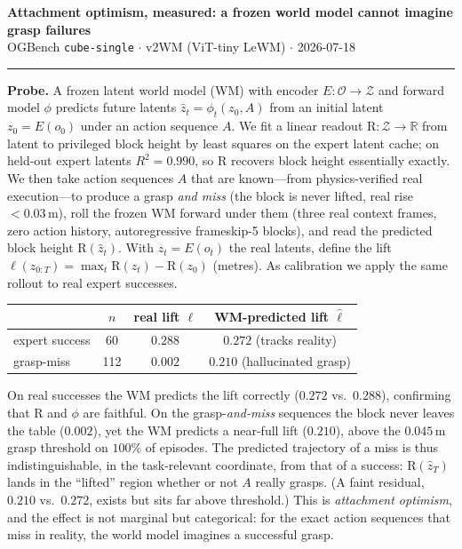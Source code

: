 \documentclass[11pt]{article}
\newcommand{\R}{\mathrm{R}}
\newcommand{\Z}{\mathcal{Z}}
\begin{document}
{\large\bfseries Attachment optimism, measured: a frozen world model cannot imagine grasp failures}\\[0.2em]
{\small OGBench \texttt{cube-single} $\cdot$ v2WM (ViT-tiny LeWM) $\cdot$ 2026-07-18}

\vspace{0.4em}
\hrule
\vspace{0.6em}

\textbf{Probe.} A frozen latent world model (WM) with encoder
$E\!:\!\mathcal{O}\!\to\!\Z$ and forward model $\phi$ predicts future latents
$\hat z_t=\phi_t(z_0,A)$ from an initial latent $z_0=E(o_0)$ under an action
sequence $A$. We fit a linear readout $\R\!:\!\Z\!\to\!\mathbb{R}$ from latent to
privileged block height by least squares on the expert latent cache; on held-out
expert latents $R^2=0.990$, so $\R$ recovers block height essentially exactly.
We then take action sequences $A$ that are known---from physics-verified real
execution---to produce a grasp \emph{and miss} (the block is never lifted, real
rise $<0.03$\,m), roll the frozen WM forward under them (three real context
frames, zero action history, autoregressive frameskip-5 blocks), and read the
predicted block height $\R(\hat z_t)$. With $z_t=E(o_t)$ the real latents, define
the lift $\ell(z_{0:T})=\max_t \R(z_t)-\R(z_0)$ (metres). As calibration we apply
the same rollout to real expert successes.

\begin{center}
\small
\begin{tabular}{lccc}
\toprule
 & $n$ & real lift $\ell$ & \textbf{WM-predicted lift} $\hat\ell$ \\
\midrule
expert success & 60  & $0.288$ & $0.272$ \quad(tracks reality) \\
grasp-miss     & 112 & $0.002$ & $\mathbf{0.210}$ \quad(hallucinated grasp) \\
\bottomrule
\end{tabular}
\end{center}

On real successes the WM predicts the lift correctly ($0.272$ vs.\ $0.288$),
confirming that $\R$ and $\phi$ are faithful. On the grasp-\emph{and-miss}
sequences the block never leaves the table ($0.002$), yet the WM predicts a
near-full lift ($0.210$), above the $0.045$\,m grasp threshold on $100\%$ of
episodes. The predicted trajectory of a miss is thus indistinguishable, in the
task-relevant coordinate, from that of a success: $\R(\hat z_T)$ lands in the
``lifted'' region whether or not $A$ really grasps. (A faint residual, $0.210$
vs.\ $0.272$, exists but sits far above threshold.) This is \emph{attachment
optimism}, and the effect is not marginal but categorical: for the exact action
sequences that miss in reality, the world model imagines a successful grasp.
\end{document}
